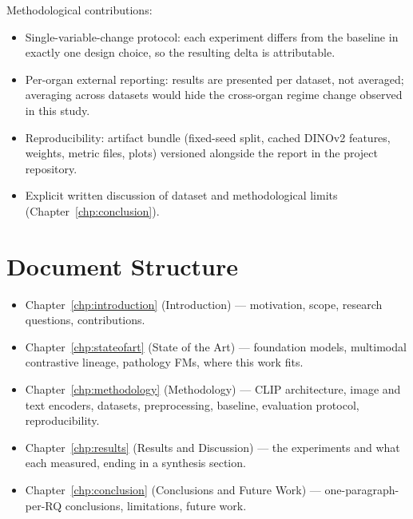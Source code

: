 Methodological contributions:
\begin{itemize}
    \item Single-variable-change protocol: each experiment differs from the baseline in exactly one design choice, so the resulting delta is attributable.
    \item Per-organ external reporting: results are presented per dataset, not averaged; averaging across datasets would hide the cross-organ regime change observed in this study.
    \item Reproducibility: artifact bundle (fixed-seed split, cached DINOv2 features, weights, metric files, plots) versioned alongside the report in the project repository.
    \item Explicit written discussion of dataset and methodological limits (Chapter~\ref{chp:conclusion}).
\end{itemize}


\section{Document Structure}
\label{sec:intro-structure}
\begin{itemize}
    \item Chapter~\ref{chp:introduction} (Introduction) --- motivation, scope, research questions, contributions.
    \item Chapter~\ref{chp:stateofart} (State of the Art) --- foundation models, multimodal contrastive lineage, pathology FMs, where this work fits.
    \item Chapter~\ref{chp:methodology} (Methodology) --- CLIP architecture, image and text encoders, datasets, preprocessing, baseline, evaluation protocol, reproducibility.
    \item Chapter~\ref{chp:results} (Results and Discussion) --- the experiments and what each measured, ending in a synthesis section.
    \item Chapter~\ref{chp:conclusion} (Conclusions and Future Work) --- one-paragraph-per-RQ conclusions, limitations, future work.
\end{itemize}
